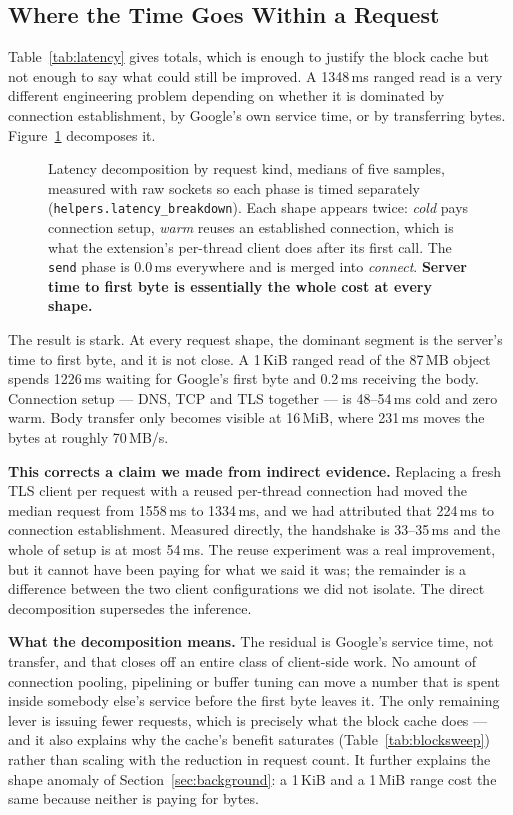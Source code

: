 \documentclass[sigconf, nonacm]{acmart}
\begin{document}
\subsection{Where the Time Goes Within a Request}
\label{sec:breakdown}

Table~\ref{tab:latency} gives totals, which is enough to justify the block
cache but not enough to say what could still be improved. A 1348\,ms ranged
read is a very different engineering problem depending on whether it is
dominated by connection establishment, by Google's own service time, or by
transferring bytes. Figure~\ref{fig:breakdown} decomposes it.

\begin{figure}[t]
\centering

\caption{Latency decomposition by request kind, medians of five samples,
measured with raw sockets so each phase is timed separately
(\texttt{helpers.latency\_breakdown}). Each shape appears twice: \emph{cold}
pays connection setup, \emph{warm} reuses an established connection, which is
what the extension's per-thread client does after its first call. The
\texttt{send} phase is 0.0\,ms everywhere and is merged into
\emph{connect}. \textbf{Server time to first byte is essentially the whole
cost at every shape.}}
\label{fig:breakdown}
\end{figure}

The result is stark. At every request shape, the dominant segment is the
server's time to first byte, and it is not close. A 1\,KiB ranged read of the
87\,MB object spends 1226\,ms waiting for Google's first byte and 0.2\,ms
receiving the body. Connection setup --- DNS, TCP and TLS together --- is 48--54\,ms
cold and zero warm. Body transfer only becomes visible at 16\,MiB, where
231\,ms moves the bytes at roughly 70\,MB/s.

\textbf{This corrects a claim we made from indirect evidence.} Replacing a
fresh TLS client per request with a reused per-thread connection had moved the
median request from 1558\,ms to 1334\,ms, and we had attributed that 224\,ms to
connection establishment. Measured directly, the handshake is 33--35\,ms and
the whole of setup is at most 54\,ms. The reuse experiment was a real
improvement, but it cannot have been paying for what we said it was; the
remainder is a difference between the two client configurations we did not
isolate. The direct decomposition supersedes the inference.

\textbf{What the decomposition means.} The residual is Google's service time,
not transfer, and that closes off an entire class of client-side work.
No amount of connection pooling, pipelining or buffer tuning can move a number
that is spent inside somebody else's service before the first byte leaves it.
The only remaining lever is issuing fewer requests, which is precisely what the
block cache does --- and it also explains why the cache's benefit saturates
(Table~\ref{tab:blocksweep}) rather than scaling with the reduction in request
count. It further explains the shape anomaly of
Section~\ref{sec:background}: a 1\,KiB and a 1\,MiB range cost the same because
neither is paying for bytes.
\end{document}

